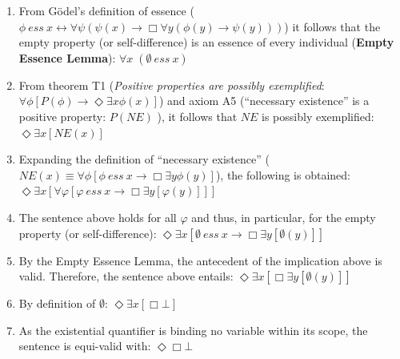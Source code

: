 \documentclass{llncs}
\newcommand{\imp}{{\rightarrow}}
\newcommand{\biimp}{\leftrightarrow}
\newcommand{\allq}{\forall}
\newcommand{\exq}{\exists}
\newcommand{\Dia}{\Diamond} %
\newcommand{\NE}{\mathit{NE}}
\newcommand{\ess}[2]{#1\ \mathit{ess}\ #2}
\newcommand{\nec}{\Box}
\newcommand{\pos}{\Dia}
\begin{document}
\begin{enumerate}
\item From G\"odel's definition of essence 
(${\ess{\phi}{x} \biimp {\allq \psi} (\psi(x)
\imp {\nec} \allq y (\phi(y) \imp \psi(y)))}$) it follows that the
empty property (or self-difference) is an essence of every individual
(\textbf{Empty Essence Lemma}): \hfill $\allq x\; (\ess{\emptyset}{x})$

\item From theorem T1 (\textit{Positive properties are possibly
  exemplified}: ${\allq \phi} [P(\phi) \imp {\pos}  \exq x
  \phi(x)]$) and axiom A5 (``necessary existence'' is a positive
  property: $P(\NE)$ ), it follows that $\NE$ is possibly exemplified:
  \hfill $  \pos \exq x [\NE(x)] $
 
\item Expanding the definition of ``necessary existence''
  (${\NE(x) \equiv \allq \phi [\ess{\phi}{x} \imp \nec \exq y
    \phi(y)]}$), the following is obtained: \hfill $  \pos \exq x
  [\allq \varphi [ \ess{\varphi}{x} \imp \nec \exq y [\varphi(y)] ] ] $

\item The sentence above holds for all $\varphi$ and thus, in
  particular, for the empty property (or self-difference): \hfill $\pos \exq x [ \ess{\emptyset}{x} \imp \nec \exq y [\emptyset(y)] ]$

\item By the Empty Essence Lemma, the antecedent of the implication
  above is valid. Therefore, the sentence above entails: \hfill $\pos \exq x [ \nec \exq y [\emptyset(y)] ]$ 

\item By definition of $\emptyset$: \hfill $\pos \exq x [ \nec \bot ]$

\item As the existential quantifier is binding no variable within its
  scope, the sentence is equi-valid with: \hfill $\pos \nec \bot $


\end{enumerate}
\end{document}
